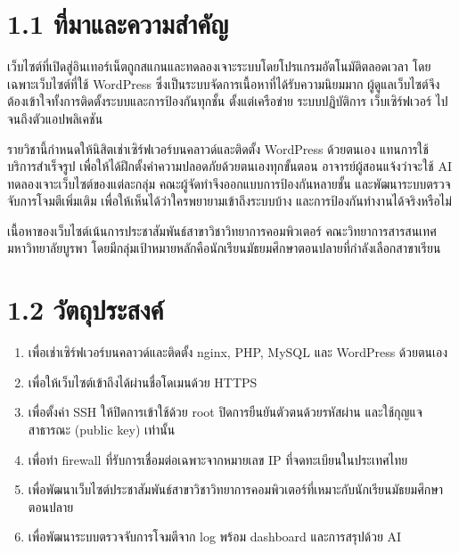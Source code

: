 
\section*{1.1 ที่มาและความสำคัญ}

เว็บไซต์ที่เปิดสู่อินเทอร์เน็ตถูกสแกนและทดลองเจาะระบบโดยโปรแกรมอัตโนมัติตลอดเวลา โดยเฉพาะเว็บไซต์ที่ใช้ WordPress ซึ่งเป็นระบบจัดการเนื้อหาที่ได้รับความนิยมมาก ผู้ดูแลเว็บไซต์จึงต้องเข้าใจทั้งการติดตั้งระบบและการป้องกันทุกชั้น ตั้งแต่เครือข่าย ระบบปฏิบัติการ เว็บเซิร์ฟเวอร์ ไปจนถึงตัวแอปพลิเคชัน

รายวิชานี้กำหนดให้นิสิตเช่าเซิร์ฟเวอร์บนคลาวด์และติดตั้ง WordPress ด้วยตนเอง แทนการใช้บริการสำเร็จรูป เพื่อให้ได้ฝึกตั้งค่าความปลอดภัยด้วยตนเองทุกขั้นตอน อาจารย์ผู้สอนแจ้งว่าจะใช้ AI ทดลองเจาะเว็บไซต์ของแต่ละกลุ่ม คณะผู้จัดทำจึงออกแบบการป้องกันหลายชั้น และพัฒนาระบบตรวจจับการโจมตีเพิ่มเติม เพื่อให้เห็นได้ว่าใครพยายามเข้าถึงระบบบ้าง และการป้องกันทำงานได้จริงหรือไม่

เนื้อหาของเว็บไซต์เน้นการประชาสัมพันธ์สาขาวิชาวิทยาการคอมพิวเตอร์ คณะวิทยาการสารสนเทศ มหาวิทยาลัยบูรพา โดยมีกลุ่มเป้าหมายหลักคือนักเรียนมัธยมศึกษาตอนปลายที่กำลังเลือกสาขาเรียน

\section*{1.2 วัตถุประสงค์}

\begin{enumerate}
\def\labelenumi{\arabic{enumi}.}
\tightlist
\item
  เพื่อเช่าเซิร์ฟเวอร์บนคลาวด์และติดตั้ง nginx, PHP, MySQL และ WordPress ด้วยตนเอง
\item
  เพื่อให้เว็บไซต์เข้าถึงได้ผ่านชื่อโดเมนด้วย HTTPS
\item
  เพื่อตั้งค่า SSH ให้ปิดการเข้าใช้ด้วย root ปิดการยืนยันตัวตนด้วยรหัสผ่าน และใช้กุญแจสาธารณะ (public key) เท่านั้น
\item
  เพื่อทำ firewall ที่รับการเชื่อมต่อเฉพาะจากหมายเลข IP ที่จดทะเบียนในประเทศไทย
\item
  เพื่อพัฒนาเว็บไซต์ประชาสัมพันธ์สาขาวิชาวิทยาการคอมพิวเตอร์ที่เหมาะกับนักเรียนมัธยมศึกษาตอนปลาย
\item
  เพื่อพัฒนาระบบตรวจจับการโจมตีจาก log พร้อม dashboard และการสรุปด้วย AI
\end{enumerate}

